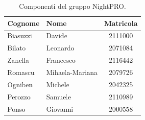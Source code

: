\documentclass[a4paper, 11pt, oneside]{scrartcl}
\begin{document}
\begin{table}[H]
    \centering
    \renewcommand{\arraystretch}{1.2}
    \begin{tabular}{@{}llc@{}}
        \toprule
        \textbf{Cognome} & \textbf{Nome}   & \textbf{Matricola} \\
        \midrule
        Biasuzzi         & Davide          & 2111000            \\
        Bilato           & Leonardo        & 2071084            \\
        Zanella          & Francesco       & 2116442            \\
        Romascu          & Mihaela-Mariana & 2079726            \\
        Ogniben          & Michele         & 2042325            \\
        Perozzo          & Samuele         & 2110989            \\
        Ponso            & Giovanni        & 2000558            \\
        \bottomrule
    \end{tabular}
    \caption{Componenti del gruppo NightPRO.}
\end{table}

\newpage


\newpage


\newpage


\newpage


\newpage


\newpage


\newpage

\end{document}
